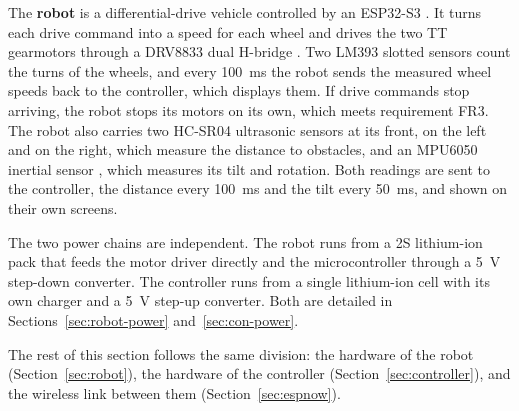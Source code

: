 The \textbf{robot} is a differential-drive vehicle \cite{siegwart2004} controlled by an ESP32-S3 \cite{esp32s3_datasheet}. It
turns each drive command into a speed for each wheel and drives the two TT gearmotors
through a DRV8833 dual H-bridge \cite{drv8833_datasheet}. Two LM393 slotted sensors
\cite{lm393_datasheet} count the turns of the wheels, and every 100~ms the robot sends the
measured wheel speeds back to the controller, which displays them. If drive commands stop
arriving, the robot stops its motors on its own, which meets requirement FR3. The robot
also carries two HC-SR04 ultrasonic sensors \cite{hcsr04_datasheet} at its front, on the
left and on the right, which measure the distance to obstacles, and an MPU6050 inertial sensor \cite{mpu6000_ps},
which measures its tilt and rotation. Both readings are sent to the
controller, the distance every 100~ms and the tilt every 50~ms, and shown on their own
screens.

The two power chains are independent. The robot runs from a 2S lithium-ion pack that
feeds the motor driver directly and the microcontroller through a 5~V step-down
converter. The controller runs from a single lithium-ion cell with its own charger and a
5~V step-up converter. Both are detailed in Sections~\ref{sec:robot-power}
and~\ref{sec:con-power}.

The rest of this section follows the same division: the hardware of the robot
(Section~\ref{sec:robot}), the hardware of the controller (Section~\ref{sec:controller}),
and the wireless link between them (Section~\ref{sec:espnow}).

